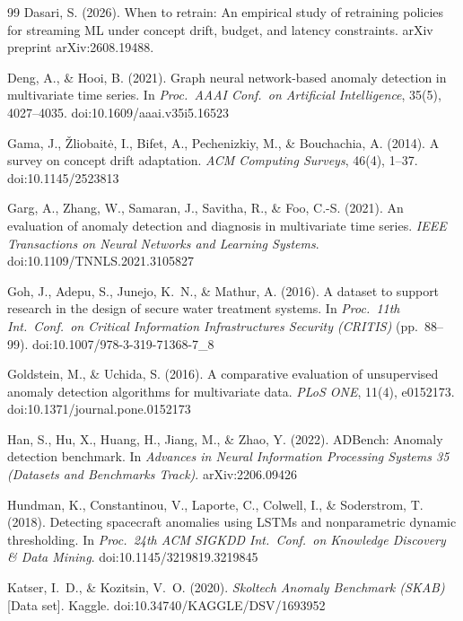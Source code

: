 \documentclass[11pt]{article}
\begin{document}
\begin{thebibliography}{99}
 Dasari, S. (2026). When to retrain: An empirical study of retraining policies for streaming ML under concept drift, budget, and latency constraints. arXiv preprint arXiv:2608.19488.

 Deng, A., \& Hooi, B. (2021). Graph neural network-based anomaly detection in multivariate time series. In \emph{Proc.\ AAAI Conf.\ on Artificial Intelligence}, 35(5), 4027--4035. doi:10.1609/aaai.v35i5.16523

 Gama, J., \v{Z}liobait\.{e}, I., Bifet, A., Pechenizkiy, M., \& Bouchachia, A. (2014). A survey on concept drift adaptation. \emph{ACM Computing Surveys}, 46(4), 1--37. doi:10.1145/2523813

 Garg, A., Zhang, W., Samaran, J., Savitha, R., \& Foo, C.-S. (2021). An evaluation of anomaly detection and diagnosis in multivariate time series. \emph{IEEE Transactions on Neural Networks and Learning Systems}. doi:10.1109/TNNLS.2021.3105827

 Goh, J., Adepu, S., Junejo, K.~N., \& Mathur, A. (2016). A dataset to support research in the design of secure water treatment systems. In \emph{Proc.\ 11th Int.\ Conf.\ on Critical Information Infrastructures Security (CRITIS)} (pp.\ 88--99). doi:10.1007/978-3-319-71368-7\_8

 Goldstein, M., \& Uchida, S. (2016). A comparative evaluation of unsupervised anomaly detection algorithms for multivariate data. \emph{PLoS ONE}, 11(4), e0152173. doi:10.1371/journal.pone.0152173

 Han, S., Hu, X., Huang, H., Jiang, M., \& Zhao, Y. (2022). ADBench: Anomaly detection benchmark. In \emph{Advances in Neural Information Processing Systems 35 (Datasets and Benchmarks Track)}. arXiv:2206.09426

 Hundman, K., Constantinou, V., Laporte, C., Colwell, I., \& Soderstrom, T. (2018). Detecting spacecraft anomalies using LSTMs and nonparametric dynamic thresholding. In \emph{Proc.\ 24th ACM SIGKDD Int.\ Conf.\ on Knowledge Discovery \& Data Mining}. doi:10.1145/3219819.3219845

 Katser, I.~D., \& Kozitsin, V.~O. (2020). \emph{Skoltech Anomaly Benchmark (SKAB)} [Data set]. Kaggle. doi:10.34740/KAGGLE/DSV/1693952


\end{thebibliography}
\end{document}
